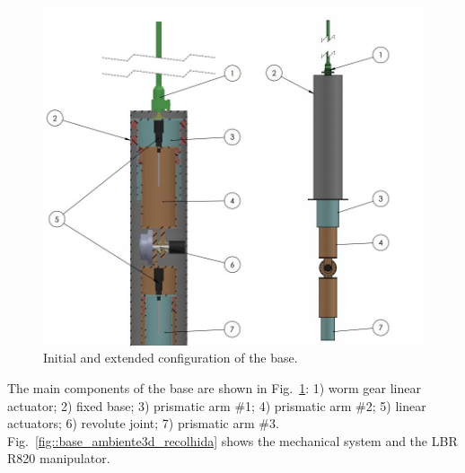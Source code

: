 \begin{figure}[h!]
\centering
	\includegraphics[width=\columnwidth]{figs/estudo/solid/baselbr.jpg} 
	\caption{Initial and extended configuration of the base.}
	\label{fig::baselbr}
\end{figure}



The main components of the base are shown in Fig.~\ref{fig::baselbr}: 1) worm
gear linear actuator; 2) fixed base; 3) prismatic arm \#1; 4) prismatic arm \#2;
5) linear actuators; 6) revolute joint; 7) prismatic arm \#3.
Fig.~\ref{fig::base_ambiente3d_recolhida} shows the mechanical system and the
LBR R820 manipulator.


